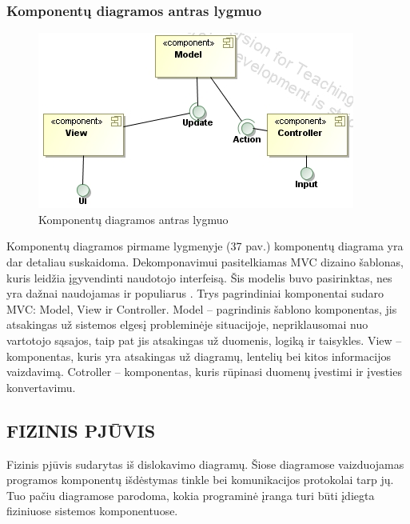 \documentclass{VUMIFPSkursinis}
\begin{document}
\subsubsection{Komponentų diagramos antras lygmuo}
\begin{figure}[H]
\centering
\includegraphics[scale=1, frame]{img/komponentu3.png}
\caption{Komponentų diagramos antras lygmuo}
\end{figure}
Komponentų diagramos pirmame lygmenyje (37 pav.) komponentų diagrama yra dar detaliau suskaidoma. Dekomponavimui pasitelkiamas MVC dizaino šablonas, kuris leidžia įgyvendinti naudotojo interfeisą. Šis modelis buvo pasirinktas, nes yra dažnai naudojamas ir populiarus . Trys pagrindiniai komponentai sudaro MVC: Model, View ir Controller. Model – pagrindinis šablono komponentas, jis atsakingas už sistemos elgesį probleminėje situacijoje, nepriklausomai nuo vartotojo sąsajos, taip pat jis atsakingas už duomenis, logiką ir taisykles. View – komponentas, kuris yra atsakingas už diagramų, lentelių bei kitos informacijos vaizdavimą. Cotroller – komponentas, kuris rūpinasi duomenų įvestimi ir įvesties konvertavimu.
\newpage
\subsection{FIZINIS PJŪVIS}
Fizinis pjūvis sudarytas iš dislokavimo diagramų. Šiose diagramose vaizduojamas programos komponentų išdėstymas tinkle bei komunikacijos protokolai tarp jų. Tuo pačiu diagramose parodoma, kokia programinė įranga turi būti įdiegta fiziniuose sistemos komponentuose.
\end{document}
